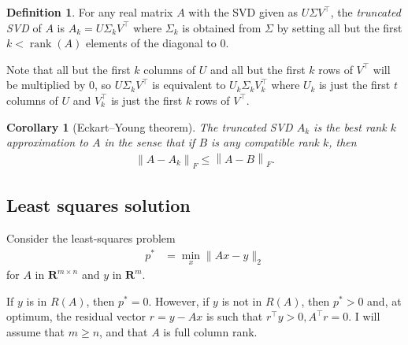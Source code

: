 \documentclass[]{article}
\theoremstyle{plain}
\newtheorem*{cor}{Corollary}
\theoremstyle{definition}
\newtheorem{defn}{Definition}
\theoremstyle{remark}
\newcommand{\reals}{\mathbf{R}}
\newcommand\norm[1]{\left\lVert#1\right\rVert}
\newcommand\rank[1]{\operatorname{rank}\left( #1\right)}
\begin{document}
\begin{defn}
For any real matrix $A$ with the SVD given as $U\Sigma V^\top$, the \emph{truncated
SVD} of $A$ is $A_k = U\Sigma_k V^\top$ where $\Sigma_k$ is obtained from
$\Sigma$ by setting all but the first $k<\rank{A}$ elements of the diagonal to $0$.
\end{defn}

Note that all but the first $k$ columns of $U$ and all but the first $k$ rows of
$V^\top$ will be multiplied by $0$, so $U\Sigma_k V^\top$ is equivalent to
$U_k\Sigma_k V_k^\top$ where $U_k$ is just the first $t$ columns of $U$ and
$V_k^\top$ is just the first $k$ rows of $V^\top$.

\begin{cor}[Eckart–Young theorem]
The truncated SVD $A_k$ is the best rank $k$ approximation to $A$ in the sense that
if $B$ is any compatible rank $k$, then
\begin{align*}
\norm{A - A_k}_F \le \norm{A - B}_F.
\end{align*}
\end{cor}

\subsection{Least squares solution}\label{least-squares-solution}

Consider the least-squares problem
\begin{align*}
p^\ast &= \min_x \|Ax-y\|_2
\end{align*}
for $A$ in $\reals^{m \times n}$ and $y$ in $\reals^m$.

If $y$ is in $R(A)$, then $p^\ast = 0$.  However, if $y$ is not in $R(A)$,
then $p^\ast > 0$ and, at optimum, the residual vector $r = y - Ax$ is such
that $r^\top y > 0, A^\top r = 0$.  I will assume
that $m \ge n$, and that $A$ is full column rank.
\end{document}
